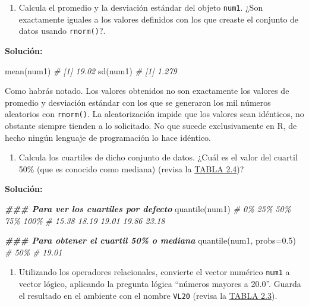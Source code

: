 \documentclass[
]{article}
\newenvironment{Shaded}{\begin{snugshade}}{\end{snugshade}}
\newcommand{\AttributeTok}[1]{\textcolor[rgb]{0.77,0.63,0.00}{#1}}
\newcommand{\CommentTok}[1]{\textcolor[rgb]{0.56,0.35,0.01}{\textit{#1}}}
\newcommand{\DocumentationTok}[1]{\textcolor[rgb]{0.56,0.35,0.01}{\textbf{\textit{#1}}}}
\newcommand{\FloatTok}[1]{\textcolor[rgb]{0.00,0.00,0.81}{#1}}
\newcommand{\FunctionTok}[1]{\textcolor[rgb]{0.00,0.00,0.00}{#1}}
\newcommand{\NormalTok}[1]{#1}
\providecommand{\tightlist}{%
  \setlength{\itemsep}{0pt}\setlength{\parskip}{0pt}}
\theoremstyle{definition}
\theoremstyle{definition}
\theoremstyle{definition}
\theoremstyle{definition}
\theoremstyle{remark}
\begin{document}
\begin{enumerate}
\def\labelenumi{\arabic{enumi}.}
\tightlist
\item
  Calcula el promedio y la desviación estándar del objeto \texttt{num1}. ¿Son exactamente iguales a los valores definidos con los que creaste el conjunto de datos usando \texttt{rnorm()}?.
\end{enumerate}

\textbf{Solución:}

\begin{Shaded}
\begin{Highlighting}[]
\FunctionTok{mean}\NormalTok{(num1)}
\CommentTok{\# [1] 19.02}
\FunctionTok{sd}\NormalTok{(num1)}
\CommentTok{\# [1] 1.279}
\end{Highlighting}
\end{Shaded}

Como habrás notado. Los valores obtenidos no son exactamente los valores de promedio y desviación estándar con los que se generaron los mil números aleatorios con \texttt{rnorm()}. La aleatorización impide que los valores sean idénticos, no obstante siempre tienden a lo solicitado. No que sucede exclusivamente en R, de hecho ningún lenguaje de programación lo hace idéntico.

\begin{enumerate}
\def\labelenumi{\arabic{enumi}.}
\tightlist
\item
  Calcula los cuartiles de dicho conjunto de datos. ¿Cuál es el valor del cuartil 50\% (que es conocido como mediana) (revisa la \protect\hyperlink{funciones-buxe1sica-uxfatiles}{TABLA 2.4})?
\end{enumerate}

\textbf{Solución:}

\begin{Shaded}
\begin{Highlighting}[]
\DocumentationTok{\#\#\# Para ver los cuartiles por defecto}
\FunctionTok{quantile}\NormalTok{(num1)}
\CommentTok{\#    0\%   25\%   50\%   75\%  100\% }
\CommentTok{\# 15.38 18.19 19.01 19.86 23.18}

\DocumentationTok{\#\#\# Para obtener el cuartil 50\% o mediana}
\FunctionTok{quantile}\NormalTok{(num1, }\AttributeTok{probs=}\FloatTok{0.5}\NormalTok{)}
\CommentTok{\#   50\% }
\CommentTok{\# 19.01}
\end{Highlighting}
\end{Shaded}

\begin{enumerate}
\def\labelenumi{\arabic{enumi}.}
\tightlist
\item
  Utilizando los operadores relacionales, convierte el vector numérico \texttt{num1} a vector lógico, aplicando la pregunta lógica ``números mayores a 20.0''. Guarda el resultado en el ambiente con el nombre \texttt{VL20} (revisa la \protect\hyperlink{operadores-luxf3gicos-y-relacionales}{TABLA 2.3}).
\end{enumerate}
\end{document}
